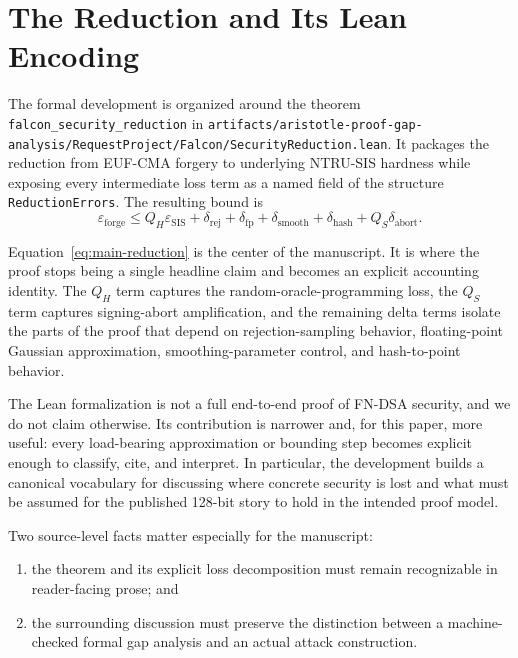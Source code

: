\documentclass[11pt]{article}
\begin{document}
\section{The Reduction and Its Lean Encoding}

The formal development is organized around the theorem \texttt{falcon\_security\_reduction} in \texttt{artifacts/aristotle-proof-gap-analysis/RequestProject/Falcon/SecurityReduction.lean}. It packages the reduction from EUF-CMA forgery to underlying NTRU-SIS hardness while exposing every intermediate loss term as a named field of the structure \texttt{ReductionErrors}. The resulting bound is
\begin{equation}
\label{eq:main-reduction}
\varepsilon_{\mathrm{forge}} \le Q_H \varepsilon_{\mathrm{SIS}} + \delta_{\mathrm{rej}} + \delta_{\mathrm{fp}} + \delta_{\mathrm{smooth}} + \delta_{\mathrm{hash}} + Q_S \delta_{\mathrm{abort}}.
\end{equation}

Equation~\eqref{eq:main-reduction} is the center of the manuscript. It is where the proof stops being a single headline claim and becomes an explicit accounting identity. The $Q_H$ term captures the random-oracle-programming loss, the $Q_S$ term captures signing-abort amplification, and the remaining delta terms isolate the parts of the proof that depend on rejection-sampling behavior, floating-point Gaussian approximation, smoothing-parameter control, and hash-to-point behavior.

The Lean formalization is not a full end-to-end proof of FN-DSA security, and we do not claim otherwise. Its contribution is narrower and, for this paper, more useful: every load-bearing approximation or bounding step becomes explicit enough to classify, cite, and interpret. In particular, the development builds a canonical vocabulary for discussing where concrete security is lost and what must be assumed for the published 128-bit story to hold in the intended proof model.

Two source-level facts matter especially for the manuscript:
\begin{enumerate}
\item the theorem and its explicit loss decomposition must remain recognizable in reader-facing prose; and
\item the surrounding discussion must preserve the distinction between a machine-checked formal gap analysis and an actual attack construction.
\end{enumerate}
\end{document}
